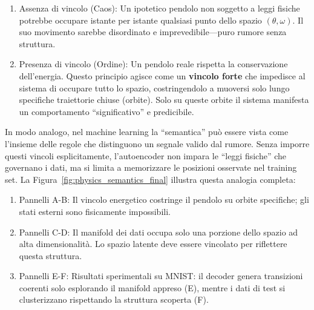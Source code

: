 \begin{enumerate}[label=\roman*.]
    \item Assenza di vincolo (Caos): Un ipotetico pendolo non soggetto a leggi fisiche potrebbe occupare istante per istante qualsiasi punto dello spazio $(\theta, \omega)$. Il suo movimento sarebbe disordinato e imprevedibile—puro rumore senza struttura.
    \item Presenza di vincolo (Ordine): Un pendolo reale rispetta la conservazione dell'energia. Questo principio agisce come un \textbf{vincolo forte} che impedisce al sistema di 
    occupare 
    tutto lo spazio, costringendolo a muoversi solo lungo specifiche traiettorie chiuse (orbite). Solo su queste orbite il sistema manifesta un comportamento ``significativo'' e predicibile.
\end{enumerate}

In modo analogo, nel machine learning la ``semantica'' può essere vista come l'insieme delle regole che distinguono un segnale valido dal rumore. Senza imporre questi vincoli esplicitamente, l'autoencoder non impara le ``leggi fisiche'' che governano i dati, ma si limita a memorizzare le posizioni osservate nel training set.
La Figura~\ref{fig:physics_semantics_final} illustra questa analogia completa:
\begin{enumerate}[label=\roman*.]
    \item Pannelli A-B: Il vincolo energetico costringe il pendolo su orbite specifiche; gli stati esterni sono fisicamente impossibili.
    \item Pannelli C-D: Il manifold dei dati occupa solo una porzione dello spazio ad alta dimensionalità. Lo spazio latente deve essere vincolato per riflettere questa struttura.
    \item Pannelli E-F: Risultati sperimentali su MNIST: il decoder genera transizioni coerenti solo esplorando il manifold appreso (E), mentre i dati di test si clusterizzano rispettando la struttura scoperta (F).
\end{enumerate}

